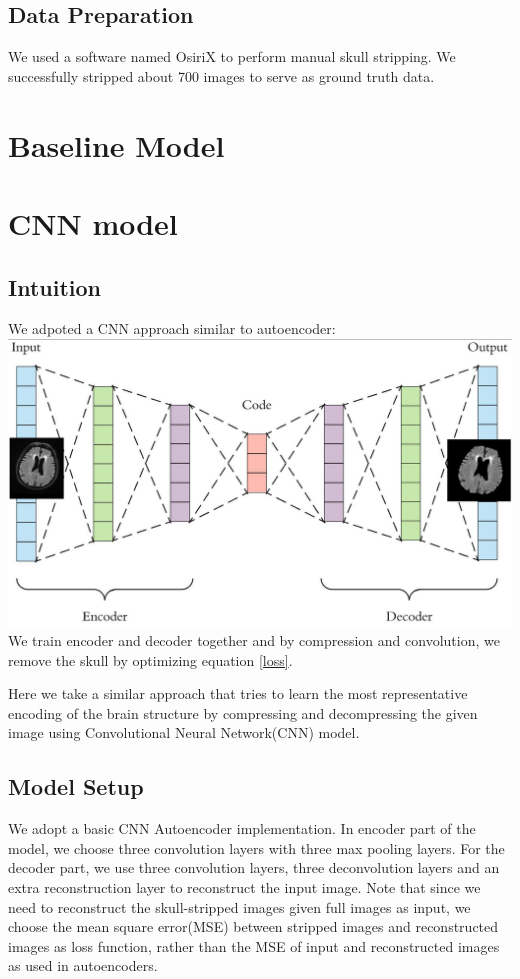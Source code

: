 \documentclass[conference]{IEEEtran}
\begin{document}
\subsection*{Data Preparation}
We used a software named OsiriX to perform manual skull stripping. We successfully stripped about 700 images to serve as ground truth data.

\section{Baseline Model}

\section{CNN model}
\subsection*{Intuition}
We adpoted a CNN approach similar to autoencoder:
\includegraphics[scale = 0.3]{Snipaste_2018-05-28_14-16-23.png}
We train encoder and decoder together and by compression and convolution, we remove the skull by optimizing equation \ref{loss}. 

Here we take a similar approach that tries to learn the most representative encoding of the brain structure by compressing and decompressing the given image using Convolutional Neural Network(CNN) model. 

\subsection*{Model Setup}
We adopt a basic CNN Autoencoder implementation. In encoder part of the model, we choose three convolution layers with three max pooling layers. For the decoder part, we use three convolution layers, three deconvolution layers and an extra reconstruction layer to reconstruct the input image. Note that since we need to reconstruct the skull-stripped images given full images as input, we choose the mean square error(MSE) between stripped images and reconstructed images as loss function, rather than the MSE of input and reconstructed images as used in autoencoders.
\end{document}

